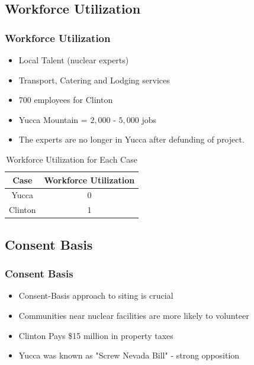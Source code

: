 \subsection{Workforce Utilization}

\begin{frame}
	\frametitle{Workforce Utilization}
	\begin{itemize}
		\item Local Talent (nuclear experts)
		\item Transport, Catering and Lodging services
		\item 700 employees for Clinton \cite{exelon_clinton_2016}
		\item Yucca Mountain = $2,000$ - $5,000$ jobs \cite{riddel_economic_2003}
		\item The experts are no longer in Yucca after defunding of project.
	\end{itemize}
	
	\begin{table}[h]
		\centering
		\caption {Workforce Utilization for Each Case}
		\begin{tabular}{|c|c|}
			\hline
			Case & Workforce Utilization \\
			\hline
			Yucca & 0 \\
			Clinton & 1 \\
			\hline
		\end{tabular}
	\end{table}
\end{frame}


\subsection{Consent Basis}		

\begin{frame}
	\frametitle{Consent Basis}
	\begin{itemize}
		\item Consent-Basis approach to siting is crucial \cite{ayers_blue_2012,doe_designing_2016,jenkins-smith_public_2013,freeze_siting_2015}
		\item Communities near nuclear facilities are more likely to volunteer \cite{olsson_experiences_2013}
		\item Clinton Pays \$15 million in property taxes \cite{brady-lunny_dewitt_2016}
		\item Yucca was known as "Screw Nevada Bill" - strong opposition
	\end{itemize}
\end{frame}
		
